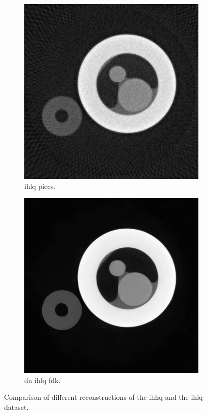 \begin{figure}
    \medskip
  
    \begin{subfigure}[t]{.45\textwidth}
      \centering
      \includegraphics[width=\linewidth]{figures/kimrobertPICCS.png}
      \caption{\acrlong{ihlq} \gls{piccs}. }
    \end{subfigure}
    \hfill
    \begin{subfigure}[t]{.45\textwidth}
      \centering
      \includegraphics[width=\linewidth]{figures/kimrobertdepth1dn.png}
      \caption{\acrlong{dn} \acrlong{ihlq} \gls{fdk}. }
    \end{subfigure}
    \caption[Comparison of different reconstructions of IHHQ and IHLQ]{Comparison of different reconstructions of the \gls{ihhq} and the \gls{ihlq} dataset. }
    \label{fig:kimrobertcomparison}
\end{figure}
